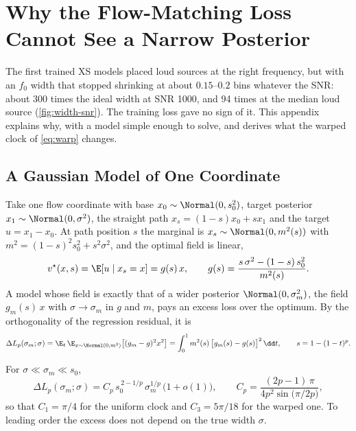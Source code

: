 \section{Why the Flow-Matching Loss Cannot See a Narrow Posterior}
\label{app:sensitivity}

The first trained XS models placed loud sources at the right frequency, but with an $f_0$
width that stopped shrinking at about $0.15$--$0.2$ bins whatever the SNR: about 300 times the
ideal width at SNR 1000, and 94 times at the median loud source (\cref{fig:width-snr}). The training loss gave no sign of it. This
appendix explains why, with a model simple enough to solve, and derives what the warped clock
of \cref{eq:warp} changes.

\subsection{A Gaussian Model of One Coordinate}

Take one flow coordinate with base $x_0\sim\Normal(0,s_0^2)$, target posterior
$x_1\sim\Normal(0,\sigma^2)$, the straight path $x_s = (1-s)x_0 + s x_1$ and the target
$u = x_1 - x_0$. At path position $s$ the marginal is $x_s\sim\Normal(0, m^2(s))$ with
$m^2 = (1-s)^2s_0^2 + s^2\sigma^2$, and the optimal field is linear,
\begin{equation}
  v^\star(x,s) = \E[u\mid x_s = x] = g(s)\,x,\qquad
  g(s) = \frac{s\,\sigma^2 - (1-s)\,s_0^2}{m^2(s)} .
\end{equation}
A model whose field is exactly that of a wider posterior $\Normal(0,\sigma_m^2)$, the field
$g_m(s)\,x$ with $\sigma\to\sigma_m$ in $g$ and $m$, pays an excess loss over the optimum. By
the orthogonality of the regression residual, it is
\begin{equation}
  \Delta L_p(\sigma_m;\sigma) = \E_{t}\,\E_{x\sim\Normal(0,m^2)}\bigl[(g_m - g)^2x^2\bigr]
  = \int_0^1 m^2(s)\,\bigl[g_m(s) - g(s)\bigr]^2\,\dd t,\qquad s = 1-(1-t)^p .
  \label{eq:excess}
\end{equation}

\begin{proposition}
\label{prop:sensitivity}
For $\sigma\ll\sigma_m\ll s_0$,
\begin{equation}
  \Delta L_p(\sigma_m;\sigma) = C_p\,s_0^{\,2-1/p}\,\sigma_m^{1/p}\,\bigl(1+o(1)\bigr),\qquad
  C_p = \frac{(2p-1)\,\pi}{4p^2\sin\bigl(\pi/2p\bigr)},
  \label{eq:sensitivity}
\end{equation}
so that $C_1 = \pi/4$ for the uniform clock and $C_3 = 5\pi/18$ for the warped one. To leading
order the excess does not depend on the true width $\sigma$.
\end{proposition}


